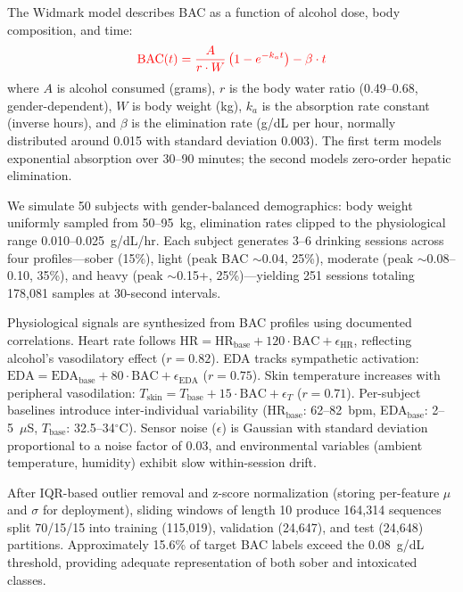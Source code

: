\documentclass[HARVARD,Times2COL]{WileyNJDv5} %
\providecommand{\DIFadd}[1]{{\protect\color{red} #1}} %
\begin{document}
\DIFadd{The Widmark model describes BAC as a function of alcohol dose, body composition, and time:
}\begin{equation}
\DIFadd{\text{BAC}(t) = \frac{A}{r \cdot W} \left(1 - e^{-k_a t}\right) - \beta \cdot t
}\end{equation}
\DIFadd{where $A$ is alcohol consumed (grams), $r$ is the body water ratio (0.49--0.68, gender-dependent), $W$ is body weight (kg), $k_a$ is the absorption rate constant (inverse hours), and $\beta$ is the elimination rate (g/dL per hour, normally distributed around 0.015 with standard deviation 0.003). The first term models exponential absorption over 30--90 minutes; the second models zero-order hepatic elimination.
}

\DIFadd{We simulate 50 subjects with gender-balanced demographics: body weight uniformly sampled from 50--95~kg, elimination rates clipped to the physiological range 0.010--0.025~g/dL/hr. Each subject generates 3--6 drinking sessions across four profiles---sober (15\%), light (peak BAC $\sim$0.04, 25\%), moderate (peak $\sim$0.08--0.10, 35\%), and heavy (peak $\sim$0.15+, 25\%)---yielding 251 sessions totaling 178,081 samples at 30-second intervals.
}

\DIFadd{Physiological signals are synthesized from BAC profiles using documented correlations. Heart rate follows $\text{HR} = \text{HR}_{\text{base}} + 120 \cdot \text{BAC} + \epsilon_{\text{HR}}$, reflecting alcohol's vasodilatory effect ($r = 0.82$). EDA tracks sympathetic activation: $\text{EDA} = \text{EDA}_{\text{base}} + 80 \cdot \text{BAC} + \epsilon_{\text{EDA}}$ ($r = 0.75$). Skin temperature increases with peripheral vasodilation: $T_{\text{skin}} = T_{\text{base}} + 15 \cdot \text{BAC} + \epsilon_T$ ($r = 0.71$). Per-subject baselines introduce inter-individual variability (HR$_{\text{base}}$: 62--82~bpm, EDA$_{\text{base}}$: 2--5~$\mu$S, $T_{\text{base}}$: 32.5--34$^\circ$C). Sensor noise ($\epsilon$) is Gaussian with standard deviation proportional to a noise factor of 0.03, and environmental variables (ambient temperature, humidity) exhibit slow within-session drift.
}

\DIFadd{After IQR-based outlier removal and z-score normalization (storing per-feature $\mu$ and $\sigma$ for deployment), sliding windows of length 10 produce 164,314 sequences split 70/15/15 into training (115,019), validation (24,647), and test (24,648) partitions. Approximately 15.6\% of target BAC labels exceed the 0.08~g/dL threshold, providing adequate representation of both sober and intoxicated classes.
}
\end{document}
